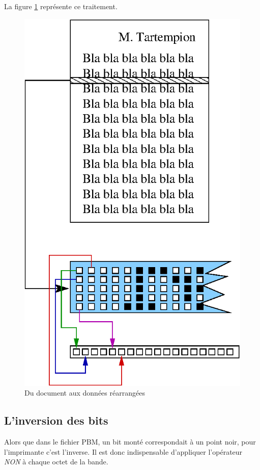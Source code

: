 La figure \ref{fig:bande} représente ce traitement.

\begin{figure}[ht]
\centering
\includegraphics{Images/bande.eps}
\caption{Du document aux données réarrangées}
\label{fig:bande}
\end{figure}

\subsection{L'inversion des bits}
Alors que dans le fichier PBM, un bit monté correspondait à un point noir, 
pour l'imprimante c'est l'inverse. Il est donc indispensable d'appliquer
l'opérateur \emph{NON} à chaque octet de la bande.

